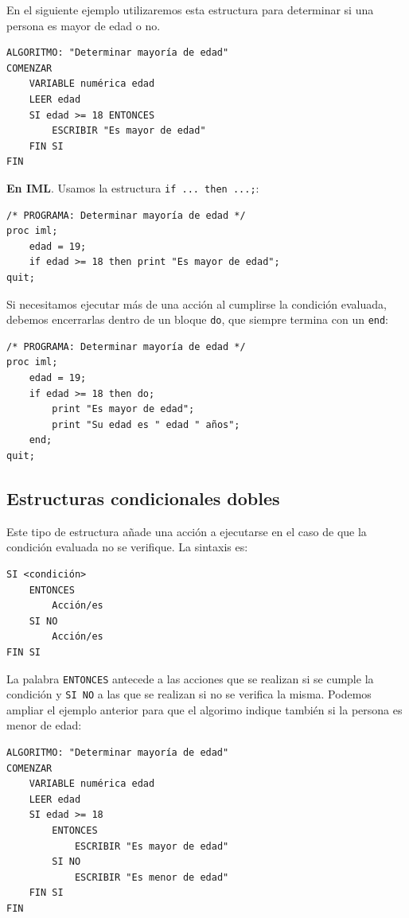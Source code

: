 \documentclass[]{book}
\begin{document}
En el siguiente ejemplo utilizaremos esta estructura para determinar si una persona es mayor de edad o no.

\begin{verbatim}
ALGORITMO: "Determinar mayoría de edad"
COMENZAR
    VARIABLE numérica edad
    LEER edad
    SI edad >= 18 ENTONCES
        ESCRIBIR "Es mayor de edad"
    FIN SI
FIN
\end{verbatim}

\textbf{En IML}. Usamos la estructura \texttt{if\ ...\ then\ ...;}:

\begin{verbatim}
/* PROGRAMA: Determinar mayoría de edad */
proc iml;
    edad = 19;
    if edad >= 18 then print "Es mayor de edad";
quit;
\end{verbatim}

Si necesitamos ejecutar más de una acción al cumplirse la condición evaluada, debemos encerrarlas dentro de un bloque \texttt{do}, que siempre termina con un \texttt{end}:

\begin{verbatim}
/* PROGRAMA: Determinar mayoría de edad */
proc iml;
    edad = 19;
    if edad >= 18 then do;
        print "Es mayor de edad";
        print "Su edad es " edad " años";
    end;
quit;
\end{verbatim}

\hypertarget{estructuras-condicionales-dobles}{%
\subsection{Estructuras condicionales dobles}\label{estructuras-condicionales-dobles}}

Este tipo de estructura añade una acción a ejecutarse en el caso de que la condición evaluada no se verifique. La sintaxis es:

\begin{verbatim}
SI <condición> 
    ENTONCES
        Acción/es
    SI NO
        Acción/es
FIN SI
\end{verbatim}

La palabra \texttt{ENTONCES} antecede a las acciones que se realizan si se cumple la condición y \texttt{SI\ NO} a las que se realizan si no se verifica la misma. Podemos ampliar el ejemplo anterior para que el algorimo indique también si la persona es menor de edad:

\begin{verbatim}
ALGORITMO: "Determinar mayoría de edad"
COMENZAR
    VARIABLE numérica edad
    LEER edad
    SI edad >= 18 
        ENTONCES
            ESCRIBIR "Es mayor de edad"
        SI NO
            ESCRIBIR "Es menor de edad"
    FIN SI
FIN
\end{verbatim}
\end{document}
